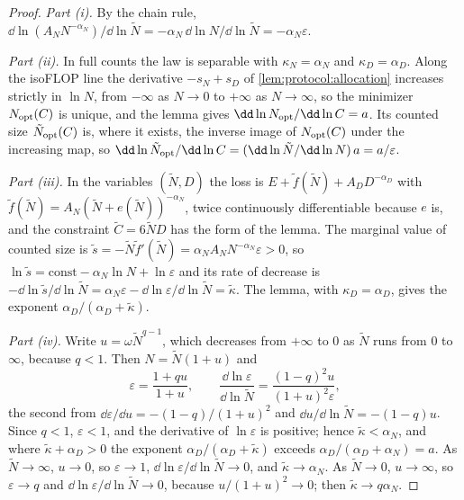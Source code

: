 \begin{refsection}
\begin{proof}
\emph{Part (i).} By the chain rule, $\dd\ln(A_NN^{-\alpha_N})/\dd\ln\tilde N=-\alpha_N\,\dd\ln N/\dd\ln\tilde N=-\alpha_N\varepsilon$.

\emph{Part (ii).} In full counts the law is separable with $\kappa_N=\alpha_N$ and $\kappa_D=\alpha_D$. Along the isoFLOP line the derivative $-s_N+s_D$ of \cref{lem:protocol:allocation} increases strictly in $\ln N$, from $-\infty$ as $N\to0$ to $+\infty$ as $N\to\infty$, so the minimizer $N_{\mathrm{opt}}(C)$ is unique, and the lemma gives $\dd\ln N_{\protocolopt}/\dd\ln C=a$. Its counted size $\tilde N_{\mathrm{opt}}(C)$ is, where it exists, the inverse image of $N_{\mathrm{opt}}(C)$ under the increasing map, so $\dd\ln\tilde N_{\protocolopt}/\dd\ln C=(\dd\ln\tilde N/\dd\ln N)\,a=a/\varepsilon$.

\emph{Part (iii).} In the variables $(\tilde N,D)$ the loss is $E+\tilde f(\tilde N)+A_DD^{-\alpha_D}$ with $\tilde f(\tilde N)=A_N(\tilde N+e(\tilde N))^{-\alpha_N}$, twice continuously differentiable because $e$ is, and the constraint $\tilde C=6\tilde ND$ has the form of the lemma. The marginal value of counted size is $\tilde s=-\tilde N\tilde f'(\tilde N)=\alpha_NA_NN^{-\alpha_N}\varepsilon>0$, so $\ln\tilde s=\mathrm{const}-\alpha_N\ln N+\ln\varepsilon$ and its rate of decrease is $-\dd\ln\tilde s/\dd\ln\tilde N=\alpha_N\varepsilon-\dd\ln\varepsilon/\dd\ln\tilde N=\tilde\kappa$. The lemma, with $\kappa_D=\alpha_D$, gives the exponent $\alpha_D/(\alpha_D+\tilde\kappa)$.

\emph{Part (iv).} Write $u=\omega\tilde N^{q-1}$, which decreases from $+\infty$ to $0$ as $\tilde N$ runs from $0$ to $\infty$, because $q<1$. Then $N=\tilde N(1+u)$ and
\[
\varepsilon=\frac{1+qu}{1+u},\qquad\frac{\dd\ln\varepsilon}{\dd\ln\tilde N}=\frac{(1-q)^2u}{(1+u)^2\varepsilon},
\]
the second from $\dd\varepsilon/\dd u=-(1-q)/(1+u)^2$ and $\dd u/\dd\ln\tilde N=-(1-q)u$. Since $q<1$, $\varepsilon<1$, and the derivative of $\ln\varepsilon$ is positive; hence $\tilde\kappa<\alpha_N$, and where $\tilde\kappa+\alpha_D>0$ the exponent $\alpha_D/(\alpha_D+\tilde\kappa)$ exceeds $\alpha_D/(\alpha_D+\alpha_N)=a$. As $\tilde N\to\infty$, $u\to0$, so $\varepsilon\to1$, $\dd\ln\varepsilon/\dd\ln\tilde N\to0$, and $\tilde\kappa\to\alpha_N$. As $\tilde N\to0$, $u\to\infty$, so $\varepsilon\to q$ and $\dd\ln\varepsilon/\dd\ln\tilde N\to0$, because $u/(1+u)^2\to0$; then $\tilde\kappa\to q\alpha_N$.
\end{proof}


\end{refsection}
